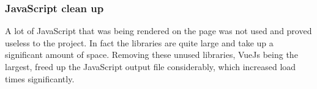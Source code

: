 \subsubsection{JavaScript clean up}
A lot of JavaScript that was being rendered on the page was not used and proved useless to the project. In fact the libraries are quite large and take up a significant amount of space. Removing these unused libraries, VueJs being the largest, freed up the JavaScript output file considerably, which increased load times significantly.
\newpage

